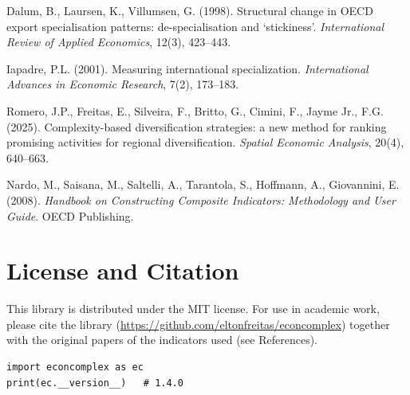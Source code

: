 \documentclass[12pt, a4paper]{article}
\begin{document}
\begin{description}[leftmargin=1.5em, style=nextline]
  \item[Dalum, Laursen \& Villumsen (1998)]
    Dalum, B., Laursen, K., Villumsen, G. (1998). Structural change in
    OECD export specialisation patterns: de-specialisation and
    `stickiness'. \textit{International Review of Applied Economics},
    12(3), 423--443.

  \item[Iapadre (2001)]
    Iapadre, P.L. (2001). Measuring international specialization.
    \textit{International Advances in Economic Research}, 7(2), 173--183.

  \item[Romero et al.\ (2025)]
    Romero, J.P., Freitas, E., Silveira, F., Britto, G., Cimini, F.,
    Jayme Jr., F.G. (2025). Complexity-based diversification strategies:
    a new method for ranking promising activities for regional
    diversification. \textit{Spatial Economic Analysis}, 20(4), 640--663.

  \item[Nardo et al.\ (2008)]
    Nardo, M., Saisana, M., Saltelli, A., Tarantola, S., Hoffmann, A.,
    Giovannini, E. (2008). \textit{Handbook on Constructing Composite
    Indicators: Methodology and User Guide}. OECD Publishing.

\end{description}

\section{License and Citation}

This library is distributed under the MIT license. For use in academic
work, please cite the library
(\url{https://github.com/eltonfreitas/econcomplex}) together with the
original papers of the indicators used (see References).

\begin{lstlisting}[language={}, caption={Check the library version}]
import econcomplex as ec
print(ec.__version__)   # 1.4.0
\end{lstlisting}
\end{document}
